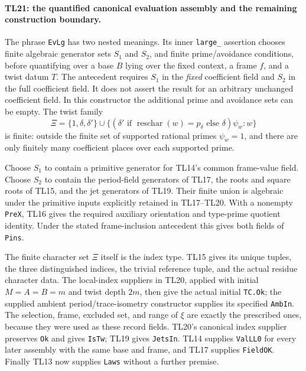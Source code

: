 \documentclass[11pt,a4paper]{article}
\numberwithin{equation}{section}
\theoremstyle{remark}\newtheorem{remark}[theorem]{Remark}
\begin{document}
\paragraph{TL21: the quantified canonical evaluation assembly and
the remaining construction boundary.}
The phrase \texttt{EvLg} has two nested meanings. Its inner
\texttt{large\_} assertion chooses finite algebraic generator
sets $S_1$ and $S_2$, and finite prime/avoidance conditions,
before quantifying over a base $B$ lying over the fixed context,
a frame $f$, and a twist datum $T$. The antecedent requires
$S_1$ in the \emph{fixed} coefficient field and $S_2$ in the full
coefficient field. It does not assert the result for an arbitrary
unchanged coefficient field. In this constructor the additional
prime and avoidance sets can be empty. The twist family
\[
 \Xi=\{1,\delta,\delta'\}\cup
       \{(\delta'\text{ if }\operatorname{reschar}(w)=p_\delta
                      \text{ else }\delta)\psi_w:w\}
 \tag{TL.22}
\]
is finite: outside the finite set of supported rational primes
$\psi_w=1$, and there are only finitely many coefficient places
over each supported prime.

Choose $S_1$ to contain a primitive generator for TL14's common
frame-value field. Choose $S_2$ to contain the period-field
generators of TL17, the roots and square roots of TL15, and the
jet generators of TL19. Their finite union is algebraic under
the primitive inputs explicitly retained in TL17--TL20.
With a nonempty \texttt{PreX}, TL16 gives the required auxiliary
orientation and type-prime quotient identity. Under the stated
frame-inclusion antecedent this gives both fields of
\texttt{Pins}.

The finite character set $\Xi$ itself is the index type. TL15
gives its unique tuples, the three distinguished indices, the
trivial reference tuple, and the actual residue character data.
The local-index suppliers in TL20, applied with initial
$M=A=B=m$ and twist depth $2m$, then give the actual initial
\texttt{TC.Ok}; the supplied ambient period/trace-isometry
constructor supplies its specified \texttt{AmbIn}. The selection,
frame, excluded set, and range of $\xi$ are exactly the prescribed
ones, because they were used as these record fields. TL20's
canonical index supplier preserves \texttt{Ok} and gives
\texttt{IsTw}; TL19 gives \texttt{JetsIn}. TL14 supplies
\texttt{ValLL0} for every later assembly with the same base and
frame, and TL17 supplies \texttt{FieldOK}. Finally TL13 now
supplies \texttt{Laws} without a further premise.
\end{document}
